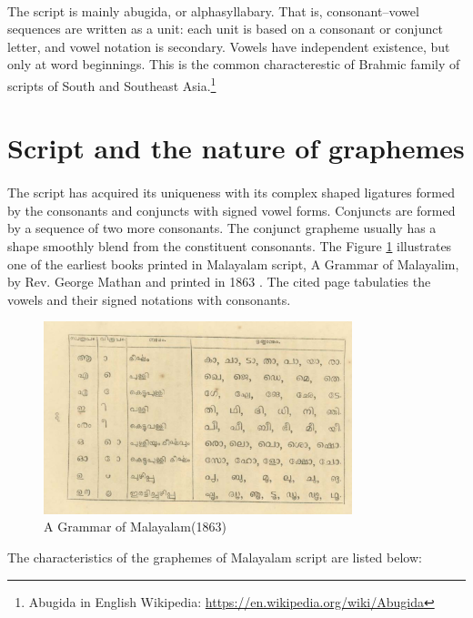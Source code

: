 \documentclass[10pt]{article}
\begin{document}
\paragraph{}
The script is mainly abugida, or alphasyllabary. That is, consonant–vowel sequences are written as a unit: each unit is based on a consonant or conjunct letter, and vowel notation is secondary. Vowels have independent existence, but only at word beginnings. This is the common characterestic of  Brahmic family of scripts of South and Southeast Asia.\footnote{Abugida in English Wikipedia: \url{https://en.wikipedia.org/wiki/Abugida}}

\section{Script and the nature of graphemes}

\paragraph{}
The script has acquired its uniqueness with its complex shaped ligatures formed by the consonants and conjuncts with signed vowel forms. Conjuncts are formed by a sequence of two more consonants. The conjunct grapheme usually has a shape smoothly blend from the constituent consonants. The Figure \ref{mathan} illustrates one of the earliest books printed in Malayalam script, A Grammar of Malayalim,  by Rev. George Mathan  and printed in 1863 \cite{georgemathan}. The cited page tabulaties the vowels and their signed notations with consonants. 

\begin{figure}[h]
	\centering
	\includegraphics[width=0.8\textwidth]{images/mathanSymbols.png}
	\caption{A Grammar of Malayalam(1863)}
	\label{mathan}
\end{figure} 

The characteristics of  the graphemes of Malayalam script are listed below:
\end{document}
